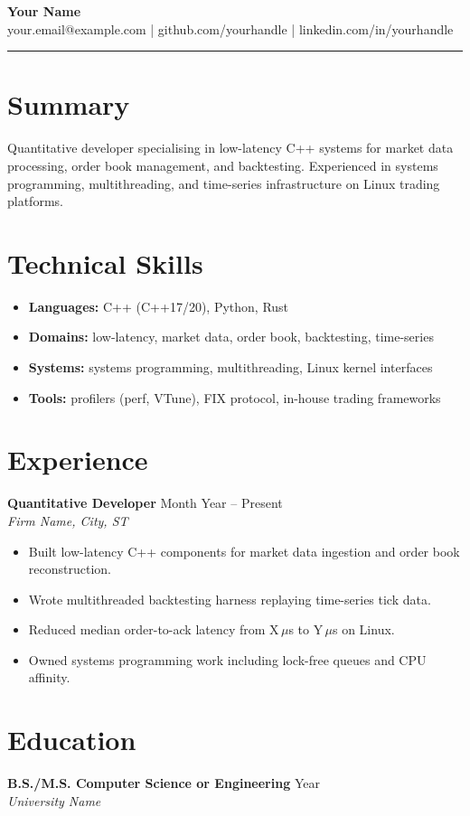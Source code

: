 \documentclass[11pt,letterpaper]{article}
\begin{document}
{\Large \textbf{Your Name}} \\
your.email@example.com \quad | \quad github.com/yourhandle \quad | \quad linkedin.com/in/yourhandle

\bigskip
\hrule
\bigskip

\section*{Summary}
Quantitative developer specialising in low-latency C++ systems for market data processing,
order book management, and backtesting. Experienced in systems programming, multithreading,
and time-series infrastructure on Linux trading platforms.

\section*{Technical Skills}
\begin{itemize}[leftmargin=*]
  \item \textbf{Languages:} C++ (C++17/20), Python, Rust
  \item \textbf{Domains:} low-latency, market data, order book, backtesting, time-series
  \item \textbf{Systems:} systems programming, multithreading, Linux kernel interfaces
  \item \textbf{Tools:} profilers (perf, VTune), FIX protocol, in-house trading frameworks
\end{itemize}

\section*{Experience}

\textbf{Quantitative Developer} \hfill Month Year -- Present \\
\textit{Firm Name, City, ST}
\begin{itemize}[leftmargin=*]
  \item Built low-latency C++ components for market data ingestion and order book reconstruction.
  \item Wrote multithreaded backtesting harness replaying time-series tick data.
  \item Reduced median order-to-ack latency from X\,$\mu$s to Y\,$\mu$s on Linux.
  \item Owned systems programming work including lock-free queues and CPU affinity.
\end{itemize}

\section*{Education}
\textbf{B.S./M.S. Computer Science or Engineering} \hfill Year \\
\textit{University Name}
\end{document}
